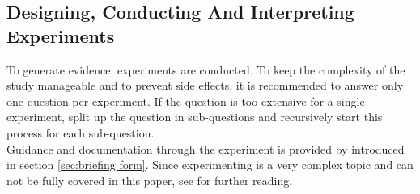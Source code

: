 
\subsection{Designing, Conducting And Interpreting Experiments}
\label{subsec:designing conducting and interpreting experiment}
To generate evidence, experiments are conducted. To keep the complexity of the study manageable and to prevent side effects, it is recommended to answer only one question per experiment. If the question is too extensive for a single experiment, split up the question in sub-questions and recursively start this process for each sub-question.\\
Guidance and documentation through the experiment is provided by \briefingform introduced in section \ref{sec:briefing form}. Since experimenting is a very complex topic and can not be fully covered in this paper, see \cite{Wohlin2012,Tullis2013} for further reading.